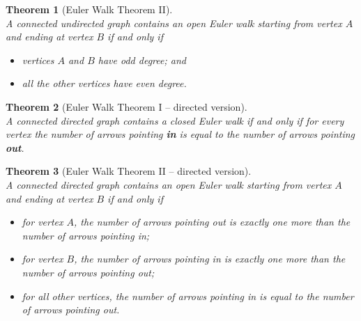 \documentclass[12pt]{article}
\newtheorem{theorem}{Theorem}[section]
\theoremstyle{definition}
\begin{document}
\begin{theorem}[Euler Walk Theorem II]
\hfill\\\normalfont A connected \textit{undirected} graph contains an \textit{open} Euler walk starting from vertex $A$ and ending at vertex $B$ if and only if
\begin{itemize}
  \item vertices $A$ and $B$ have odd degree; and
  \item all the other vertices have even degree.
\end{itemize}
\end{theorem}
\begin{theorem}[Euler Walk Theorem I -- directed version]
\hfill\\\normalfont A connected directed graph contains a \textit{closed} Euler walk if and only if for \textit{every} vertex the number of arrows pointing \textbf{in} is \textit{equal} to the number of arrows pointing \textbf{out}.
\end{theorem}
\begin{theorem}[Euler Walk Theorem II -- directed version]
\hfill\\\normalfont A connected directed graph contains an \textit{open} Euler walk starting from vertex $A$ and ending at vertex $B$ if and only if
\begin{itemize}
  \item for vertex $A$, the number of arrows pointing out is exactly one more than the number of arrows pointing in;
  \item for vertex $B$, the number of arrows pointing in is exactly one more than the number of arrows pointing out;
  \item for all other vertices, the number of arrows pointing in is equal to the number of arrows pointing out.
\end{itemize}
\end{theorem}
\end{document}
